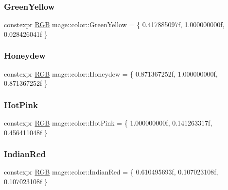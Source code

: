 \mbox{\label{namespacemage_1_1color_a28c20da179750abce432ec6439426338}} 
\subsubsection{\texorpdfstring{Green\+Yellow}{GreenYellow}}
{\footnotesize\ttfamily constexpr \mbox{\hyperlink{structmage_1_1_r_g_b}{R\+GB}} mage\+::color\+::\+Green\+Yellow = \{ 0.\+417885097f, 1.\+000000000f, 0.\+028426041f \}}

\mbox{\label{namespacemage_1_1color_a6fdd1089a1f0d6a77b9b6298907e3361}} 
\subsubsection{\texorpdfstring{Honeydew}{Honeydew}}
{\footnotesize\ttfamily constexpr \mbox{\hyperlink{structmage_1_1_r_g_b}{R\+GB}} mage\+::color\+::\+Honeydew = \{ 0.\+871367252f, 1.\+000000000f, 0.\+871367252f \}}

\mbox{\label{namespacemage_1_1color_a64c422466ccc5c44c1c4a0e6f435a3c3}} 
\subsubsection{\texorpdfstring{Hot\+Pink}{HotPink}}
{\footnotesize\ttfamily constexpr \mbox{\hyperlink{structmage_1_1_r_g_b}{R\+GB}} mage\+::color\+::\+Hot\+Pink = \{ 1.\+000000000f, 0.\+141263317f, 0.\+456411048f \}}

\mbox{\label{namespacemage_1_1color_ac72ec1deca799c7ea8a266178fcff437}} 
\subsubsection{\texorpdfstring{Indian\+Red}{IndianRed}}
{\footnotesize\ttfamily constexpr \mbox{\hyperlink{structmage_1_1_r_g_b}{R\+GB}} mage\+::color\+::\+Indian\+Red = \{ 0.\+610495693f, 0.\+107023108f, 0.\+107023108f \}}

